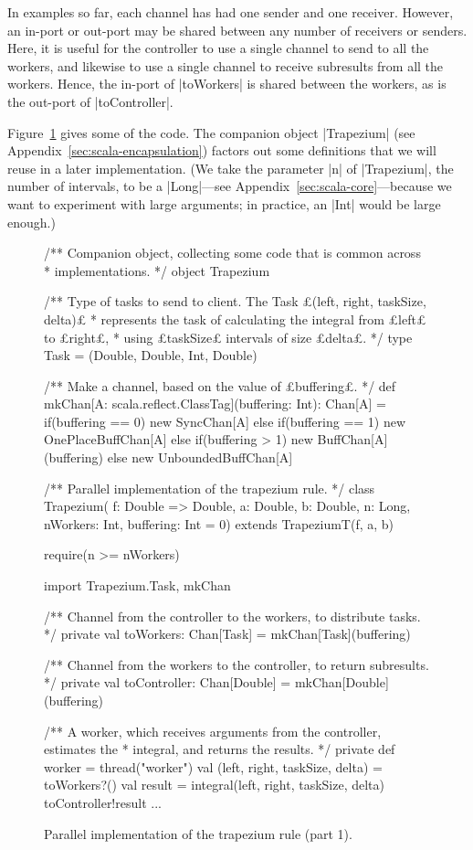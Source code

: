 In examples so far, each channel has had one sender and one receiver.
However, an in-port or out-port may be shared between any number of receivers
or senders.  Here, it is useful for the controller to use a single channel to
send to all the workers, and likewise to use a single channel to receive
subresults from all the workers.  Hence, the in-port of |toWorkers| is
shared between the workers, as is the out-port of
|toController|.

Figure~\ref{fig:trapezium-1} gives some of the code.  The companion object
|Trapezium| (see Appendix~\ref{sec:scala-encapsulation}) factors out some
definitions that we will reuse in a later implementation.  (We take the
parameter |n| of |Trapezium|, the number of intervals, to be a |Long|---see
Appendix~\ref{sec:scala-core}---because we want to experiment with large
arguments; in practice, an |Int| would be large enough.)


\begin{figure}
\begin{scala}
/** Companion object, collecting some code that is common across 
  * implementations. */
object Trapezium{
  /** Type of tasks to send to client.  The Task £(left, right, taskSize, delta)£
    * represents the task of calculating the integral from £left£ to £right£,
    * using £taskSize£ intervals of size £delta£. */
  type Task = (Double, Double, Int, Double)

  /** Make a channel, based on the value of £buffering£. */
  def mkChan[A: scala.reflect.ClassTag](buffering: Int): Chan[A] = 
    if(buffering == 0) new SyncChan[A] 
    else if(buffering == 1) new OnePlaceBuffChan[A]
    else if(buffering > 1) new BuffChan[A](buffering) 
    else new UnboundedBuffChan[A]
}

/** Parallel implementation of the trapezium rule. */
class Trapezium(
  f: Double => Double, a: Double, b: Double, 
  n: Long, nWorkers: Int, buffering: Int = 0)
    extends TrapeziumT(f, a, b){
  require(n >= nWorkers)

  import Trapezium.{Task, mkChan}

  /** Channel from the controller to the workers, to distribute tasks. */
  private val toWorkers: Chan[Task] = mkChan[Task](buffering)

  /** Channel from the workers to the controller, to return subresults. */
  private val toController: Chan[Double] = mkChan[Double](buffering)

  /** A worker, which receives arguments from the controller, estimates the
    * integral, and returns the results. */
  private def worker = thread("worker"){
    val (left, right, taskSize, delta) = toWorkers?()
    val result = integral(left, right, taskSize, delta)
    toController!result
  }
  ...
}
\end{scala}
\caption{Parallel implementation of the trapezium rule (part 1).}
\label{fig:trapezium-1}
\end{figure}

